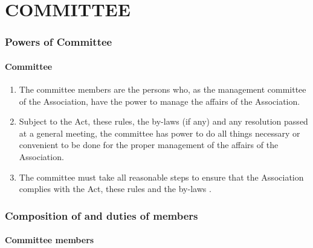 \documentclass[../constitution.tex]{subfiles}
\begin{document}
\hypertarget{part-5-committee}{%
\part{COMMITTEE}\label{part-5-committee}}

\hypertarget{division-1-powers-of-committee}{%
\section{Powers of Committee}\label{division-1-powers-of-committee}}

\hypertarget{committee}{%
\subsection{Committee}\label{committee}}

\begin{enumerate}

\item The committee members are the persons who, as the management committee of the Association, have the power to manage the affairs of the Association.
\item Subject to the Act, these rules, the by-laws (if any) and any resolution passed at a general meeting, the committee has power to do all things necessary or convenient to be done for the proper management of the affairs of the Association.
\item The committee must take all reasonable steps to ensure that the Association complies with the Act, these rules and the by-laws .
\end{enumerate}

\hypertarget{division-2-composition-of-committee-and-duties-of-members}{%
\section{Composition of  and duties of members}\label{division-2-composition-of-committee-and-duties-of-members}}

\hypertarget{committee-members}{%
\subsection{Committee members}\label{committee-members}}
\end{document}
